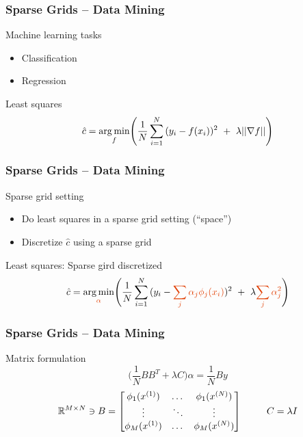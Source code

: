 \begin{frame}
  \frametitle{Sparse Grids -- Data Mining}
  \topline
  \vspace{-10px}
  \begin{block}{Machine learning tasks}
    \begin{itemize}
      \item Classification
      \item Regression
    \end{itemize}
  \end{block}
  \begin{block}{Least squares}
    $$\hat{c} = \underset{f}{\text{arg \hspace{-0.5mm}min}}\Bigg(\frac{1}{N}\sum\limits_{i = 1}^{N}{(y_i - f(x_i))^2 \ + \ \lambda ||\nabla f||} \Bigg)$$
  \end{block}
\end{frame}

\begin{frame}
  \frametitle{Sparse Grids -- Data Mining}
  \topline
  \vspace{-10px}
  \begin{block}{Sparse grid setting}
    \begin{itemize}
    \item Do least squares in a sparse grid setting (``space'')
    \item Discretize $\hat{c}$ using a sparse grid
    \end{itemize}
  \end{block}
  \begin{block}{Least squares: Sparse gird discretized}
    $$\hat{c} = \underset{\color{uipoppy}{\alpha}}{\text{arg \hspace{-0.5mm}min}}\Bigg(\frac{1}{N}
    \sum\limits_{i = 1}^{N}{(y_i - \color{uipoppy}{\sum_j{\alpha_j}\phi_j(x_i)}\color{black})^2 \ + \ 
      \lambda \color{uipoppy}{\sum_j{\alpha_j^2}}}\color{black} \Bigg)$$
  \end{block}
\end{frame}


\begin{frame}
  \frametitle{Sparse Grids -- Data Mining}
  \topline
  \vspace{-10px}
  \begin{block}{Matrix formulation}
    $$\big(\frac{1}{N} BB^T + \lambda C \big)\alpha = \frac{1}{N}By $$
    \vspace{15px}
    \[ \mathbb{R}^{M\times N} \ni B =
      \begin{bmatrix}
        \phi_1(x^{(1)}) & \dots & \phi_1(x^{(N)}) \\
        \vdots & \ddots & \vdots \\
        \phi_M(x^{(1)}) & \dots  & \phi_M(x^{(N)}) \\
      \end{bmatrix}
      \hspace{0.9cm}C = \lambda I
    \]
  \end{block}
\end{frame}


